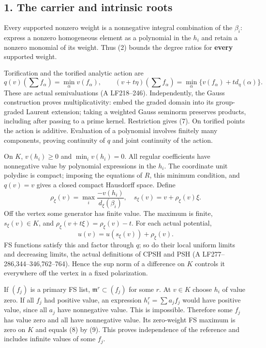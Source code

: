 \documentclass[
  10pt,
]{article}
\begin{document}
\subsection{1. The carrier and intrinsic
roots}\label{the-carrier-and-intrinsic-roots}

Every supported nonzero weight is a nonnegative integral combination of
the \(\beta_i\): express a nonzero homogeneous element as a polynomial
in the \(h_i\) and retain a nonzero monomial of its weight. Thus (2)
bounds the degree ratios for \textbf{every} supported weight.

Torification and the torified analytic action are
\[ q(v)(\textstyle\sum f_\alpha)=\min_\alpha v(f_\alpha),\qquad
 (v+t\eta)(\textstyle\sum f_\alpha)=\min_\alpha\{v(f_\alpha)+t d_\eta(\alpha)\}.                       \tag{7}\]
These are actual semivaluations (A LF218--246). Independently, the Gauss
construction proves multiplicativity: embed the graded domain into its
group-graded Laurent extension; taking a weighted Gauss seminorm
preserves products, including after passing to a prime kernel.
Restriction gives (7). On torified points the action is additive.
Evaluation of a polynomial involves finitely many components, proving
continuity of \(q\) and joint continuity of the action.

On \(K\), \(v(h_i)\geq0\) and \(\min_i v(h_i)=0\). All regular
coefficients have nonnegative value by polynomial expressions in the
\(h_i\). The coordinate unit polydisc is compact; imposing the equations
of \(R\), this minimum condition, and \(q(v)=v\) gives a closed compact
Hausdorff space. Define
\[ \rho_\xi(v)=\max_i\frac{-v(h_i)}{d_\xi(\beta_i)},\quad s_\xi(v)=v+\rho_\xi(v)\xi.                   \tag{8}\]
Off the vertex some generator has finite value. The maximum is finite,
\(s_\xi(v)\in K\), and \(\rho_\xi(v+t\xi)=\rho_\xi(v)-t\). For each
actual potential,
\[ u(v)=u(s_\xi(v))+\rho_\xi(v).                                                               \tag{9}\]
FS functions satisfy this and factor through \(q\); so do their local
uniform limits and decreasing limits, the actual definitions of CPSH and
PSH (A LF277--286,344--346,762--764). Hence the sup norm of a difference
on \(K\) controls it everywhere off the vertex in a fixed polarization.

If \((f_j)\) is a primary FS list, \(\mathfrak m^r\subset(f_j)\) for
some \(r\). At \(v\in K\) choose \(h_i\) of value zero. If all \(f_j\)
had positive value, an expression \(h_i^r=\sum a_jf_j\) would have
positive value, since all \(a_j\) have nonnegative value. This is
impossible. Therefore some \(f_j\) has value zero and all have
nonnegative value. Its zero-weight FS maximum is zero on \(K\) and
equals (8) by (9). This proves independence of the reference and
includes infinite values of some \(f_j\).
\end{document}
